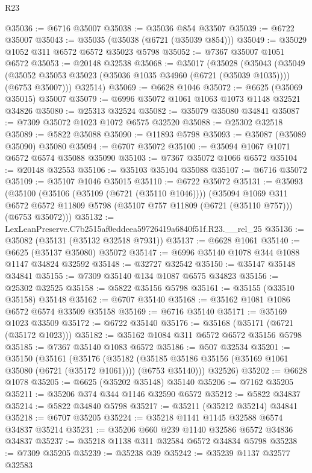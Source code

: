 \begin{lexlean}{R23}
\begin{coremodule}
@35036 := @6716 @35007
@35038 := @35036 @854 @33507
@35039 := @6722 @35007
@35043 := @35035 (@35038 (@6721 (@35039 @854)))
@35049 := @35029 @1052 @311 @6572 @6572 @35023 @5798
@35052 := @7367 @35007 @1051 @6572
@35053 := @20148 @32538
@35068 := @35017
    (@35028
      (@35043
        (@35049 (@35052 @35053 @35023 (@35036 @1035 @34960 (@6721 (@35039 @1035)))) (@6753 @35007)))
      @32514)
@35069 := @6628 @1046
@35072 := @6625 (@35069 @35015) @35007
@35079 := @6996 @35072 @1061 @1063 @1073 @1148 @32521 @34826
@35080 := @25313 @32524
@35082 := @35079 @35080 @34841
@35087 := @7309 @35072 @1023 @1072 @6575 @32520
@35088 := @25302 @32518
@35089 := @5822 @35088
@35090 := @11893 @5798
@35093 := @35087 (@35089 @35090) @35080
@35094 := @6707 @35072
@35100 := @35094 @1067 @1071 @6572 @6574 @35088 @35090
@35103 := @7367 @35072 @1066 @6572
@35104 := @20148 @32553
@35106 := @35103 @35104 @35088
@35107 := @6716 @35072
@35109 := @35107 @1046 @35015
@35110 := @6722 @35072
@35131 := @35093
    (@35100
      (@35106 (@35109 (@6721 (@35110 @1046))))
      (@35094
        @1069
        @311
        @6572
        @6572
        @11809
        @5798
        (@35107 @757 @11809 (@6721 (@35110 @757)))
        (@6753 @35072)))
@35132 := LexLeanPreserve.C7b2515af0eddeea59726419a6840f51f.R23.__rel_25
@35136 := @35082 (@35131 (@35132 @32518 @7931))
@35137 := @6628 @1061
@35140 := @6625 (@35137 @35080) @35072
@35147 := @6996 @35140 @1078 @344 @1088 @1147 @34824 @32592
@35148 := @32727 @32542
@35150 := @35147 @35148 @34841
@35155 := @7309 @35140 @134 @1087 @6575 @34823
@35156 := @25302 @32525
@35158 := @5822 @35156 @5798
@35161 := @35155 (@33510 @35158) @35148
@35162 := @6707 @35140
@35168 := @35162 @1081 @1086 @6572 @6574 @33509 @35158
@35169 := @6716 @35140
@35171 := @35169 @1023 @33509
@35172 := @6722 @35140
@35176 := @35168 (@35171 (@6721 (@35172 @1023)))
@35182 := @35162 @1084 @311 @6572 @6572 @35156 @5798
@35185 := @7367 @35140 @1083 @6572
@35186 := @507 @32534
@35201 := @35150
    (@35161
      (@35176
        (@35182 (@35185 @35186 @35156 (@35169 @1061 @35080 (@6721 (@35172 @1061)))) (@6753 @35140)))
      @32526)
@35202 := @6628 @1078
@35205 := @6625 (@35202 @35148) @35140
@35206 := @7162 @35205
@35211 := @35206 @374 @344 @1146 @32590 @6572
@35212 := @5822 @34837
@35214 := @5822 @34840 @5798
@35217 := @35211 (@35212 @35214) @34841
@35218 := @6707 @35205
@35224 := @35218 @1141 @1145 @32588 @6574 @34837 @35214
@35231 := @35206 @660 @239 @1140 @32586 @6572 @34836 @34837
@35237 := @35218 @1138 @311 @32584 @6572 @34834 @5798
@35238 := @7309 @35205
@35239 := @35238 @39
@35242 := @35239 @1137 @32577 @32583

\end{coremodule}
\end{lexlean}
